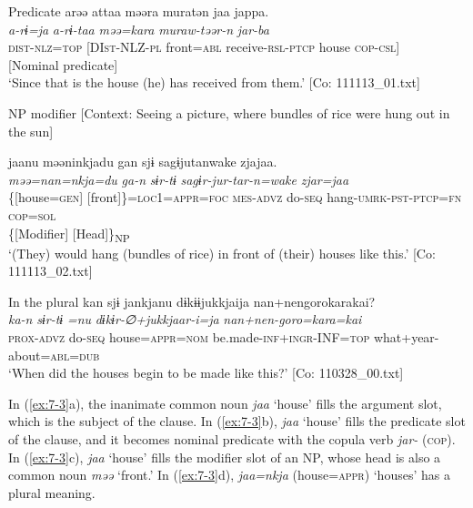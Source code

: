 \ex \label{ex:7:3b}Predicate
{\TM}
\gllll  arəə  attaa  məəra  muratən  jaa  jappa.\\
\textit{a-rɨ=ja}  \textit{a-rɨ-taa}  \textit{məə=kara}  \textit{muraw-təər-n}  \textit{}  \textit{jar-ba}\\
\textsc{dist}-\textsc{nlz}=\textsc{top}  [DI\textsc{st}-NLZ-\textsc{pl}  front=\textsc{abl}  receive-\textsc{rsl}-\textsc{ptcp}  house                               \textsc{cop}-\textsc{csl}]\\
{}[Nominal predicate]\\
\glt ‘Since that is the house (he) has received from them.’ [Co: 111113\_01.txt]

\ex \label{ex:7:3c}NP modifier
    [Context: Seeing a picture, where bundles of rice were hung out in the sun]

{\TM}
\gllll jaanu  məəninkjadu  gan  sjɨ   sagɨjutanwake  zjajaa.\\
\textit{}  \textit{məə=nan=nkja=du}  \textit{ga-n}  \textit{sɨr-tɨ} \textit{sagɨr-jur-tar-n=wake}  \textit{zjar=jaa}\\
      \{[house=\textsc{gen}]  [front]\}=\textsc{loc}1=\textsc{appr}=\textsc{foc}  \textsc{mes}-\textsc{advz}  do-\textsc{seq}                  hang-\textsc{umrk}-\textsc{pst}-\textsc{ptcp}=\textsc{fn}  \textsc{cop}=\textsc{sol}\\
      \{[Modifier]  [Head]\}\textsubscript{NP}    \\
\glt    ‘(They) would hang (bundles of rice) in front of (their) houses like this.’       [Co: 111113\_02.txt]

\ex \label{ex:7:3d}In the plural
{\TM}
\glll  kan  sjɨ  jankjanu  dɨkɨɨjukkjaija {\textbar}nan+nengoro{\textbar}karakai?\\
\textit{ka-n}  \textit{sɨr-tɨ}  \textit{=nu}  \textit{dɨkɨr-∅+jukkjaar-i=ja}  \textit{nan+nen-goro=kara=kai}\\
\textsc{prox}-\textsc{advz}  do-\textsc{seq}  house=\textsc{appr}=\textsc{nom}  be.made-\textsc{inf}+\textsc{ingr}-INF=\textsc{top}  what+year-about=\textsc{abl}=\textsc{dub}\\
\glt ‘When did the houses begin to be made like this?’ [Co: 110328\_00.txt]

\z
\z

In (\ref{ex:7-3}a), the inanimate common noun \textit{jaa} ‘house’ fills the argument slot, which is the subject of the clause. In (\ref{ex:7-3}b), \textit{jaa} ‘house’ fills the predicate slot of the clause, and it becomes nominal predicate with the copula verb \textit{jar-} (\textsc{cop}). In (\ref{ex:7-3}c), \textit{jaa} ‘house’ fills the modifier slot of an NP, whose head is also a common noun \textit{məə} ‘front.’ In (\ref{ex:7-3}d), \textit{jaa=nkja} (house=\textsc{appr}) ‘houses’ has a plural meaning.

